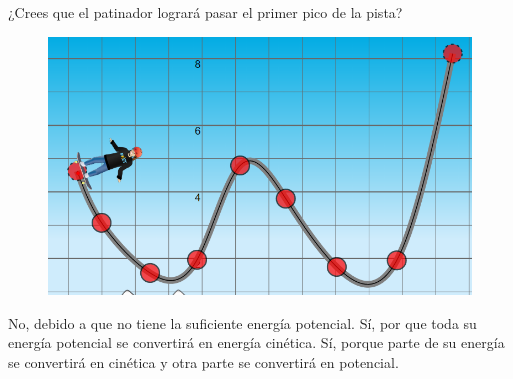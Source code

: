 ¿Crees que el patinador logrará pasar el primer pico de la pista?

\begin{minipage}{0.3\textwidth}
    \begin{figure}[H]
        \includegraphics[width=\linewidth]{../images/q028a}
    \end{figure}
\end{minipage}\hfill
\begin{minipage}{0.6\textwidth}
    \begin{choices}
        \choice No, debido a que no tiene la suficiente energía potencial.
        \choice Sí, por que toda su energía potencial se convertirá en energía cinética.
        \choice Sí, porque parte de su energía se convertirá en cinética y otra parte se convertirá en potencial.
    \end{choices}
\end{minipage}
